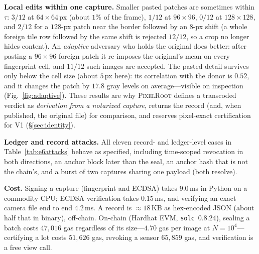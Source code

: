 \documentclass[journal]{IEEEtran}
\newcommand{\pr}{\textup{\textsc{PixelRoot}}}
\begin{document}
\textbf{Local edits within one capture.} Smaller pasted patches are sometimes
within $\tau$: $3/12$ at $64\times64$\,px (about $1\%$ of the frame), $1/12$ at
$96\times96$, $0/12$ at $128\times128$, and $2/12$ for a $128$-px patch near the
border followed by an $8$-px shift (a whole foreign tile row followed by the same
shift is rejected $12/12$, so a crop no longer hides content). An \emph{adaptive}
adversary who holds the original does better: after pasting a $96\times96$ foreign
patch it re-imposes the original's mean on every fingerprint cell, and $11/12$
such images are accepted. The pasted detail survives only below the cell size
(about $5$\,px here): its correlation with the donor is $0.52$, and it changes the
patch by $17.8$ gray levels on average---visible on inspection
(Fig.~\ref{fig:adaptive}). These results are why \pr{} defines a transcoded
verdict as \emph{derivation from a notarized capture}, returns the record (and,
when published, the original file) for comparison, and reserves pixel-exact
certification for V1 (\S\ref{sec:identity}).

\textbf{Ledger and record attacks.} All eleven record- and ledger-level cases in
Table~\ref{tab:e6attacks} behave as specified, including time-scoped revocation in
both directions, an anchor block later than the seal, an anchor hash that is not
the chain's, and a burst of two captures sharing one payload (both resolve).

\textbf{Cost.} Signing a capture (fingerprint and ECDSA) takes $9.0$\,ms in Python
on a commodity CPU; ECDSA verification takes $0.15$\,ms, and verifying an exact
camera file end to end $4.2$\,ms. A record is $\approx\!18$\,KB as hex-encoded JSON
(about half that in binary), off-chain. On-chain (Hardhat EVM, \texttt{solc}~0.8.24),
sealing a batch costs $47{,}016$ gas regardless of its size---$4.70$ gas per image
at $N\!=\!10^4$---certifying a lot costs $51{,}626$ gas, revoking a sensor
$65{,}859$ gas, and verification is a free view call.
\end{document}
